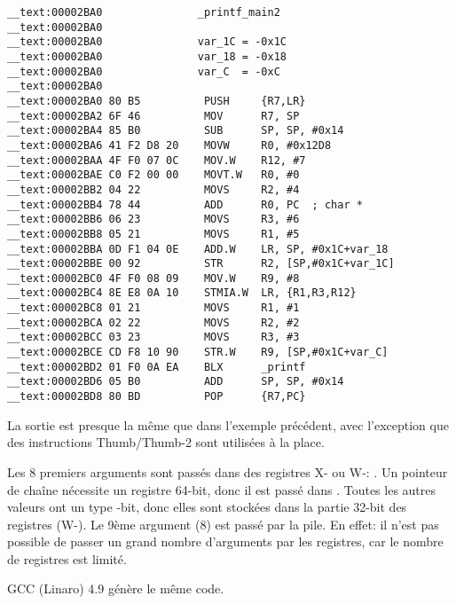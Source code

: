 \myparagraph{\OptimizingXcodeIV: \ThumbTwoMode}

\begin{lstlisting}[style=customasmARM]
__text:00002BA0               _printf_main2
__text:00002BA0
__text:00002BA0               var_1C = -0x1C
__text:00002BA0               var_18 = -0x18
__text:00002BA0               var_C  = -0xC
__text:00002BA0
__text:00002BA0 80 B5          PUSH     {R7,LR}
__text:00002BA2 6F 46          MOV      R7, SP
__text:00002BA4 85 B0          SUB      SP, SP, #0x14
__text:00002BA6 41 F2 D8 20    MOVW     R0, #0x12D8
__text:00002BAA 4F F0 07 0C    MOV.W    R12, #7
__text:00002BAE C0 F2 00 00    MOVT.W   R0, #0
__text:00002BB2 04 22          MOVS     R2, #4
__text:00002BB4 78 44          ADD      R0, PC  ; char *
__text:00002BB6 06 23          MOVS     R3, #6
__text:00002BB8 05 21          MOVS     R1, #5
__text:00002BBA 0D F1 04 0E    ADD.W    LR, SP, #0x1C+var_18
__text:00002BBE 00 92          STR      R2, [SP,#0x1C+var_1C]
__text:00002BC0 4F F0 08 09    MOV.W    R9, #8
__text:00002BC4 8E E8 0A 10    STMIA.W  LR, {R1,R3,R12}
__text:00002BC8 01 21          MOVS     R1, #1
__text:00002BCA 02 22          MOVS     R2, #2
__text:00002BCC 03 23          MOVS     R3, #3
__text:00002BCE CD F8 10 90    STR.W    R9, [SP,#0x1C+var_C]
__text:00002BD2 01 F0 0A EA    BLX      _printf
__text:00002BD6 05 B0          ADD      SP, SP, #0x14
__text:00002BD8 80 BD          POP      {R7,PC}
\end{lstlisting}

La sortie est presque la même que dans l'exemple précédent, avec l'exception que
des instructions Thumb/Thumb-2 sont utilisées à la place.





Les 8 premiers arguments sont passés dans des registres X- ou W-: \ARMPCS.
Un pointeur de chaîne nécessite un registre 64-bit, donc il est passé dans .
Toutes les autres valeurs ont un type -bit, donc elles sont stockées dans
la partie 32-bit des registres (W-).
Le 9ème argument (8) est passé par la pile.
En effet: il n'est pas possible de passer un grand nombre d'arguments par les registres,
car le nombre de registres est limité.

GCC (Linaro) 4.9 \Optimizing génère le même code.
